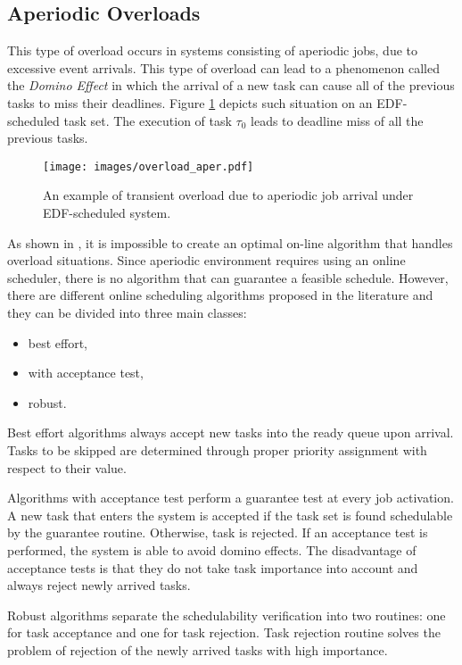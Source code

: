 \subsection{Aperiodic Overloads}
This type of overload occurs in systems consisting of aperiodic jobs, due to excessive event arrivals. 
This type of overload can lead to a phenomenon called the \textit{Domino Effect} in which the arrival of a new task can cause all of the previous tasks to miss their deadlines. 
Figure \ref{aperiodic} depicts such situation on an EDF-scheduled task set. 
The execution of task $\tau_0$ leads to deadline miss of all the previous tasks.

\begin{figure}[ht]
    \centering
    \texttt{[image: images/overload\_aper.pdf]}
    \caption{An example of transient overload due to aperiodic job arrival under EDF-scheduled system.}
    \label{aperiodic}
\end{figure}

As shown in \cite{buttazzo2011hard}, it is impossible to create an optimal on-line algorithm that handles overload situations.
Since aperiodic environment requires using an online scheduler, there is no algorithm that can guarantee a feasible schedule.
However, there are different online scheduling algorithms proposed in the literature and they can be divided into three main classes:
\begin{itemize}
    \item{best effort,}
    \item{with acceptance test,}
    \item{robust.}
\end{itemize}

Best effort algorithms always accept new tasks into the ready queue upon arrival. Tasks to be skipped are determined through proper priority assignment with respect to their value.

Algorithms with acceptance test perform a guarantee test at every job activation. 
A new task that enters the system is accepted if the task set is found schedulable by the guarantee routine. Otherwise, task is rejected.
If an acceptance test is performed, the system is able to avoid domino effects.
The disadvantage of acceptance tests is that they do not take task importance into account and always reject newly arrived tasks.

Robust algorithms separate the schedulability verification into two routines: one for task acceptance and one for task rejection. 
Task rejection routine solves the problem of rejection of the newly arrived tasks with high importance.


